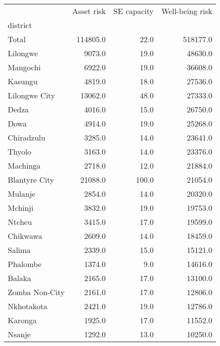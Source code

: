 \begin{tabular}{lrrr}
\toprule
{} &  Asset risk &  SE capacity &  Well-being risk \\
district       &             &              &                  \\
\midrule
Total          &    114805.0 &         22.0 &         518177.0 \\
Lilongwe       &      9073.0 &         19.0 &          48630.0 \\
Mangochi       &      6922.0 &         19.0 &          36608.0 \\
Kasungu        &      4819.0 &         18.0 &          27536.0 \\
Lilongwe City  &     13062.0 &         48.0 &          27333.0 \\
Dedza          &      4016.0 &         15.0 &          26750.0 \\
Dowa           &      4914.0 &         19.0 &          25268.0 \\
Chiradzulu     &      3285.0 &         14.0 &          23641.0 \\
Thyolo         &      3163.0 &         14.0 &          23376.0 \\
Machinga       &      2718.0 &         12.0 &          21884.0 \\
Blantyre City  &     21088.0 &        100.0 &          21054.0 \\
Mulanje        &      2854.0 &         14.0 &          20320.0 \\
Mchinji        &      3832.0 &         19.0 &          19753.0 \\
Ntcheu         &      3415.0 &         17.0 &          19599.0 \\
Chikwawa       &      2609.0 &         14.0 &          18459.0 \\
Salima         &      2339.0 &         15.0 &          15121.0 \\
Phalombe       &      1374.0 &          9.0 &          14616.0 \\
Balaka         &      2165.0 &         17.0 &          13100.0 \\
Zomba Non-City &      2161.0 &         17.0 &          12806.0 \\
Nkhotakota     &      2421.0 &         19.0 &          12786.0 \\
Karonga        &      1925.0 &         17.0 &          11552.0 \\
Nsanje         &      1292.0 &         13.0 &          10250.0 \\

\end{tabular}
